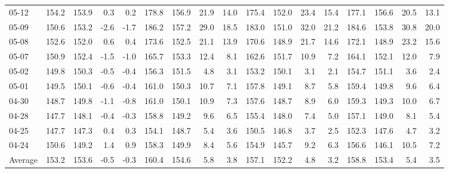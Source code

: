 \begin{threeparttable}
{\begin{tabular}{lrrrrrrrrrrrrrrrr}
  05-12 & 154.2 & 153.9 &        0.3 &            0.2 & 178.8 & 156.9 &       21.9 &           14.0 & 175.4 & 152.0 &       23.4 &           15.4 &  177.1 &  156.6 &        20.5 &             13.1 \\
  05-09 & 150.6 & 153.2 &       -2.6 &           -1.7 & 186.2 & 157.2 &       29.0 &           18.5 & 183.0 & 151.0 &       32.0 &           21.2 &  184.6 &  153.8 &        30.8 &             20.0 \\
  05-08 & 152.6 & 152.0 &        0.6 &            0.4 & 173.6 & 152.5 &       21.1 &           13.9 & 170.6 & 148.9 &       21.7 &           14.6 &  172.1 &  148.9 &        23.2 &             15.6 \\
  05-07 & 150.9 & 152.4 &       -1.5 &           -1.0 & 165.7 & 153.3 &       12.4 &            8.1 & 162.6 & 151.7 &       10.9 &            7.2 &  164.1 &  152.1 &        12.0 &              7.9 \\
  05-02 & 149.8 & 150.3 &       -0.5 &           -0.4 & 156.3 & 151.5 &        4.8 &            3.1 & 153.2 & 150.1 &        3.1 &            2.1 &  154.7 &  151.1 &         3.6 &              2.4 \\
  05-01 & 149.5 & 150.1 &       -0.6 &           -0.4 & 161.0 & 150.3 &       10.7 &            7.1 & 157.8 & 149.1 &        8.7 &            5.8 &  159.4 &  149.8 &         9.6 &              6.4 \\
  04-30 & 148.7 & 149.8 &       -1.1 &           -0.8 & 161.0 & 150.1 &       10.9 &            7.3 & 157.6 & 148.7 &        8.9 &            6.0 &  159.3 &  149.3 &        10.0 &              6.7 \\
  04-28 & 147.7 & 148.1 &       -0.4 &           -0.3 & 158.8 & 149.2 &        9.6 &            6.5 & 155.4 & 148.0 &        7.4 &            5.0 &  157.1 &  149.0 &         8.1 &              5.4 \\
  04-25 & 147.7 & 147.3 &        0.4 &            0.3 & 154.1 & 148.7 &        5.4 &            3.6 & 150.5 & 146.8 &        3.7 &            2.5 &  152.3 &  147.6 &         4.7 &              3.2 \\
  04-24 & 150.6 & 149.2 &        1.4 &            0.9 & 158.3 & 149.9 &        8.4 &            5.6 & 154.9 & 145.7 &        9.2 &            6.3 &  156.6 &  146.1 &        10.5 &              7.2 \\
Average & 153.2 & 153.6 &       -0.5 &           -0.3 & 160.4 & 154.6 &        5.8 &            3.8 & 157.1 & 152.2 &        4.8 &            3.2 &  158.8 &  153.4 &         5.4 &              3.5 \\

\end{tabular}}
\end{threeparttable}
